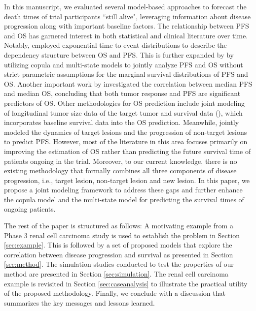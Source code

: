 In this manuscript, we evaluated several model-based approaches to forecast the death times of trial participants ``still alive", leveraging information about disease progression along with important baseline factors. The relationship between \ac{PFS} and \ac{OS} has garnered interest in both statistical and clinical literature over time. Notably, \cite{fleischer2009statistical} employed exponential time-to-event distributions to describe the dependency structure between \ac{OS} and \ac{PFS}. This is further expanded by \cite{weber2019quantifying, fu2013joint, meller2019joint} by utilizing copula and multi-state models to jointly analyze \ac{PFS} and \ac{OS} without strict parametric assumptions for the marginal survival distributions of \ac{PFS} and \ac{OS}. Another important work by \cite{shukuya2016relationship} investigated the correlation between median \ac{PFS} and median \ac{OS}, concluding that both tumor response and \ac{PFS} are significant predictors of \ac{OS}. Other methodologies for \ac{OS} prediction include joint modeling of longitudinal tumor size data of the target tumor and survival data (\cite{claret2009model, claret2013evaluation, wang2009elucidation, bruno2014evaluation, zecchin2016models, lim2019predicting}), which incorporates baseline survival data into the \ac{OS} prediction. Meanwhile, \cite{yu2020new} jointly modeled the dynamics of target lesions and the progression of non-target lesions to predict \ac{PFS}. However, most of the literature in this area focuses primarily on improving the estimation of \ac{OS} rather than predicting the future survival time of patients ongoing in the trial. Moreover, to our current knowledge, there is no existing methodology that formally combines all three components of disease progression, i.e., target lesion, non-target lesion and new lesion. In this paper, we propose a joint modeling framework to address these gaps and further enhance the copula model and the multi-state model for predicting the survival times of ongoing patients.

The rest of the paper is structured as follows: A motivating example from a Phase 3 renal cell carcinoma study is used to establish the problem in Section \ref{sec:example}. This is followed by a set of proposed models that explore the correlation between disease progression and survival as presented in Section \ref{sec:method}. The simulation studies conducted to test the properties of our method are presented in Section \ref{sec:simulation}. The renal cell carcinoma example is revisited in Section \ref{sec:caseanalysis} to illustrate the practical utility of the proposed methodology. Finally, we conclude with a discussion that summarizes the key messages and lessons learned.

